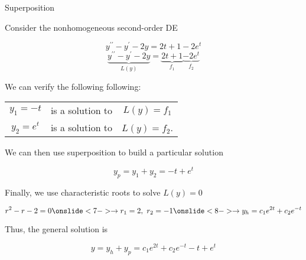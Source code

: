 \documentclass{beamer}
\begin{document}
\begin{frame}{Superposition}
\begin{example}
Consider the nonhomogeneous second-order DE

\vspace{-4mm}
\begin{overprint}
\begin{equation*}
y^{\prime\prime}-y^{\prime}-2y=2t+1-2e^{t}
\end{equation*}
\begin{equation*}
\underbrace{y^{\prime\prime}-y^{\prime}-2y}_{L(y)}=\underbrace{2t+1}_{f_1}\underbrace{-2e^{t}}_{f_2}
\end{equation*}
\end{overprint}

\vspace{1mm}
We can verify the following following:

\vspace{-3mm}
\begin{center}
\begin{tabular}{ccc}
$y_1=-t$  & is a solution to & $L(y)=f_1$\\
$y_2=e^t$ & is a solution to & $L(y)=f_2$.
\end{tabular}
\end{center}

\vspace{-1mm}
We can then use superposition to build a particular solution

\vspace{-3mm}
\begin{equation*}
y_p=y_1+y_2=-t+e^t
\end{equation*}

\vspace{-5mm}
Finally, we use characteristic roots to solve $L(y)=0$

\vspace{-3mm}
\begin{equation*}
r^2-r-2=0
\onslide<7->
\rightarrow r_1=2,\ r_2=-1
\onslide<8->
\rightarrow y_h=c_1e^{2t}+c_2e^{-t}
\end{equation*}

\vspace{-6mm}
Thus, the general solution is

\vspace{-4mm}
\begin{equation*}
y=y_h+y_p=c_1e^{2t}+c_2e^{-t}-t+e^t
\end{equation*}
\end{example}
\end{frame}
\end{document}
